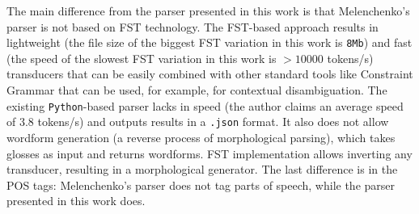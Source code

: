 The main difference from the parser presented in this work is that Melenchenko's parser is not based on FST technology. The FST-based approach results in lightweight (the file size of the biggest FST variation in this work is \texttt{8Mb}) and fast (the speed of the slowest FST variation in this work is $>10000$ tokens/s) transducers that can be easily combined with other standard tools like Constraint Grammar \parencite{karlsson_1995_cg} that can be used, for example, for contextual disambiguation. The existing \texttt{Python}-based parser lacks in speed (the author claims an average speed of $3.8$ tokens/s) and outputs results in a \texttt{.json} format. It also does not allow wordform generation (a reverse process of morphological parsing), which takes glosses as input and returns wordforms. FST implementation allows inverting any transducer, resulting in a morphological generator. The last difference is in the POS tags: Melenchenko's parser does not tag parts of speech, while the parser presented in this work does.